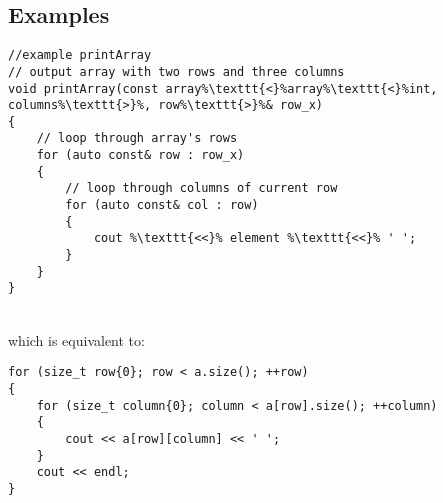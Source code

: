 \subsection{Examples}

\begin{minipage}{.5\textwidth}
\end{minipage}\hspace{0.72cm}
\begin{minipage}{.6\textwidth}
\vspace{0.1cm}
\begin{lstlisting}[frame=tlrb,numbers=none,mathescape=true,escapechar=\%,columns=flexible]
//example printArray
// output array with two rows and three columns
void printArray(const array%\texttt{<}%array%\texttt{<}%int, columns%\texttt{>}%, row%\texttt{>}%& row_x)
{
    // loop through array's rows
    for (auto const& row : row_x)
    {
        // loop through columns of current row
        for (auto const& col : row)
        {
            cout %\texttt{<<}% element %\texttt{<<}% ' ';
        }
    }
}
\end{lstlisting}
\end{minipage}
\\
which is equivalent to:\\
\begin{minipage}{.5\textwidth}
\end{minipage}\hspace{0.72cm}
\begin{minipage}{.6\textwidth}
\vspace{0.1cm}
\begin{lstlisting}[frame=tlrb,numbers=none,mathescape=true,escapechar=\%,columns=flexible]
for (size_t row{0}; row < a.size(); ++row) 
{
    for (size_t column{0}; column < a[row].size(); ++column)
    {
        cout << a[row][column] << ' ';
    }
    cout << endl;
}
\end{lstlisting}
\end{minipage}
\\



